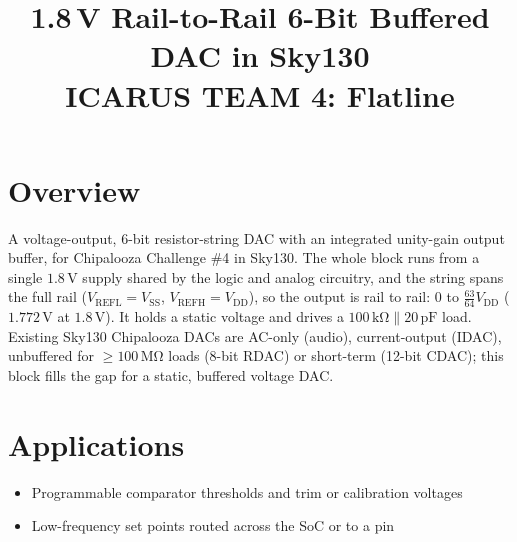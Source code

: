 \documentclass[10pt,a4paper]{article}
\title{\textbf{1.8\,V Rail-to-Rail 6-Bit Buffered DAC in Sky130} \\ \large ICARUS TEAM 4: Flatline}
\author{}
\date{}
\newcommand{\vrefh}{\ensuremath{V_{\mathrm{REFH}}}}
\newcommand{\vrefl}{\ensuremath{V_{\mathrm{REFL}}}}
\newcommand{\vdd}{\ensuremath{V_{\mathrm{DD}}}}
\newcommand{\vssa}{\ensuremath{V_{\mathrm{SS}}}}
\begin{document}
\maketitle

\section{Overview}
A voltage-output, 6-bit resistor-string DAC with an integrated unity-gain output buffer, for Chipalooza Challenge \#4 in Sky130. The whole block runs from a single $1.8\,\mathrm{V}$ supply shared by the logic and analog circuitry, and the string spans the full rail ($\vrefl = \vssa$, $\vrefh = \vdd$), so the output is rail to rail: $0$ to $\tfrac{63}{64}\vdd$ ($1.772\,\mathrm{V}$ at $1.8\,\mathrm{V}$). It holds a static voltage and drives a $100\,\mathrm{k\Omega} \parallel 20\,\mathrm{pF}$ load. Existing Sky130 Chipalooza DACs are AC-only (audio), current-output (IDAC), unbuffered for $\geq 100\,\mathrm{M\Omega}$ loads (8-bit RDAC) or short-term (12-bit CDAC); this block fills the gap for a static, buffered voltage DAC.

\section{Applications}
\begin{itemize}
    \item Programmable comparator thresholds and trim or calibration voltages
    \item Low-frequency set points routed across the SoC or to a pin
\end{itemize}

\end{document}
